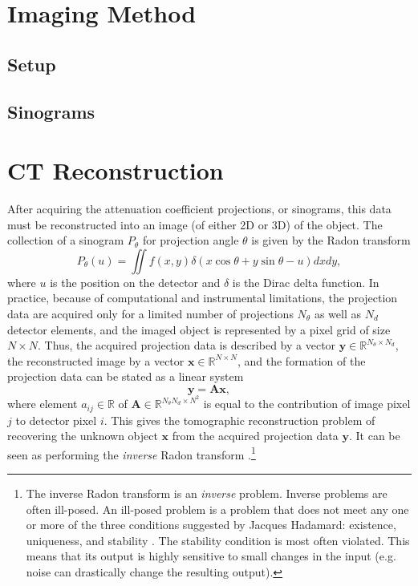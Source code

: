 \section{Imaging Method}
\subsection{Setup}
\subsection{Sinograms}

\section{CT Reconstruction}
\label{sec:ct:reconstruction}
After acquiring the attenuation coefficient projections, or sinograms, this data must be reconstructed into an image (of either 2D or 3D) of the object. The collection of a sinogram $P_\theta$ for projection angle $\theta$ is given by the Radon transform \cite{4307775,jimaging4110128}
\begin{equation}
    \label{eq:radontransform}
    P_\theta(u) = \iint f\left(x,y \right)\delta\left(x \cos \theta + y \sin \theta -u \right)dxdy,
\end{equation}
where $u$ is the position on the detector and $\delta$ is the Dirac delta function. In practice, because of computational and instrumental limitations, the projection data are acquired only for a limited number of projections $N_\theta$ as well as $N_d$ detector elements, and the imaged object is represented by a pixel grid of size $N \times N$. Thus, the acquired projection data is described by a vector $\bm{y} \in \mathbb{R}^{N_\theta \times N_d}$, the reconstructed image by a vector $\bm{x} \in \mathbb{R}^{N \times N}$, and the formation of the projection data can be stated as a linear system \cite{jimaging4110128}
\begin{equation}
    \label{eq:projectiondata}
    \bm{y} = \bm{A}\bm{x},
\end{equation}
where element $a_{ij} \in \mathbb{R}$ of $\bm{A} \in \mathbb{R}^{N_\theta N_d \times N^2}$ is equal to the contribution of image pixel $j$ to detector pixel $i$. This gives the tomographic reconstruction problem of recovering the unknown object $\bm{x}$ from the acquired projection data $\bm{y}$. It can be seen as performing the \textit{inverse} Radon transform \cite{KabanikhinIllVersed,GANrec}.\footnote{The inverse Radon transform is an \textit{inverse} problem. Inverse problems are often ill-posed. An ill-posed problem is a problem that does not meet any one or more of the three conditions suggested by Jacques Hadamard: existence, uniqueness, and stability \cite{KabanikhinIllVersed}. The stability condition is most often violated. This means that its output is highly sensitive to small changes in the input (e.g. noise can drastically change the resulting output). }

